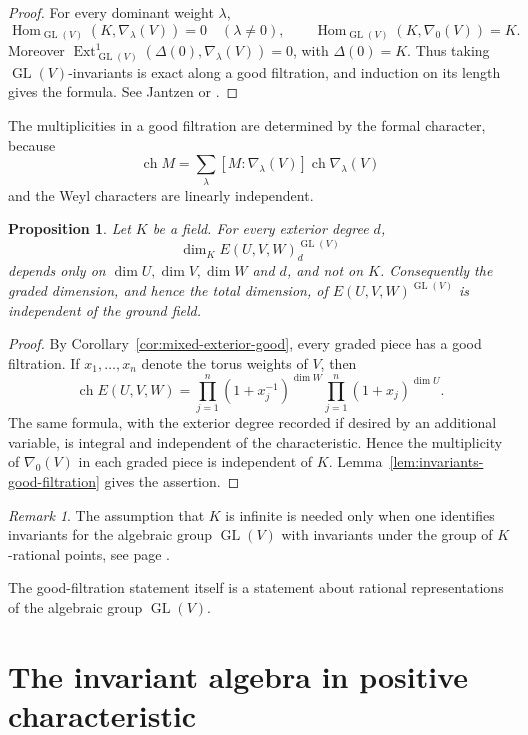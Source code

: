 \documentclass[10pt]{amsart}
\newtheorem{proposition}[theorem]{Proposition}
\theoremstyle{definition}
\theoremstyle{remark}
\newtheorem{remark}[theorem]{Remark}
\newcommand{\GL}{\operatorname{GL}}
\begin{document}
\begin{proof}
For every dominant weight $\lambda$,
\[
\operatorname{Hom}_{\GL(V)}(K,\nabla_\lambda(V))=0\quad(\lambda\ne0),
\qquad
\operatorname{Hom}_{\GL(V)}(K,\nabla_0(V))=K.
\]
Moreover
$\operatorname{Ext}^1_{\GL(V)}(\Delta(0),\nabla_\lambda(V))=0$, with
$\Delta(0)=K$. Thus taking $\GL(V)$-invariants is exact along a good filtration,
and induction on its length gives the formula. See
Jantzen \cite[II.4.13--II.4.16]{Jantzen} or \cite{depr0}.
\end{proof}


The multiplicities in a good filtration are determined by the formal
character, because
\[
\operatorname{ch}M
=
\sum_\lambda [M:\nabla_\lambda(V)]\operatorname{ch}\nabla_\lambda(V)
\]
and the Weyl characters are linearly independent.

\begin{proposition}
\label{thm:field-independence-GL}
Let $K$ be a  field. For every exterior degree $d$,
\[
\dim_K E(U,V,W)_d^{\GL(V)}
\]
depends only on $\dim U,\dim V,\dim W$ and $d$, and not on $K$.
Consequently the graded dimension, and hence the total dimension, of
$E(U,V,W)^{\GL(V)}$ is independent of the   ground field.
\end{proposition}

\begin{proof}
By Corollary~\ref{cor:mixed-exterior-good}, every graded piece has a good
filtration. If $x_1,\ldots,x_n$ denote the torus weights of $V$, then
\[
\operatorname{ch}E(U,V,W)
=
\prod_{j=1}^n(1+x_j^{-1})^{\dim W}
\prod_{j=1}^n(1+x_j)^{\dim U}.
\]
The same formula, with the exterior degree recorded if desired by an
additional variable, is integral and independent of the characteristic.
Hence the multiplicity of $\nabla_0(V)$ in each graded piece is independent of
$K$. Lemma~\ref{lem:invariants-good-filtration} gives the assertion.
\end{proof}

\begin{remark}
The assumption that $K$ is infinite is needed only when one identifies
invariants for the algebraic group $\GL(V)$ with invariants under the group
of $K$-rational points, see page \pageref{pogf}. 

The good-filtration statement itself is a statement
about rational representations of the algebraic group $\GL(V)$.
\end{remark}

\section{The invariant algebra in positive characteristic}
\label{sec:positive-characteristic-invariants}
\end{document}
